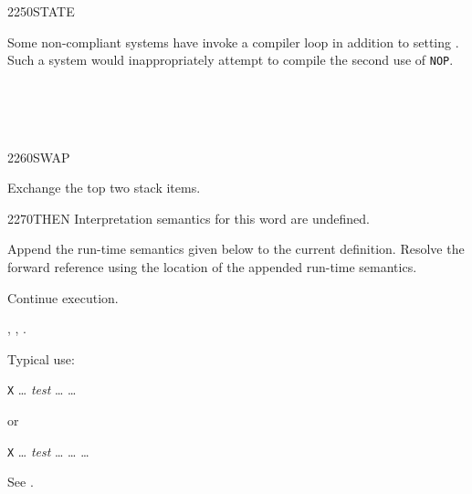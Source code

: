 \begin{worddef}{2250}{STATE}
\begin{rationale}
		Some non-compliant systems have \word{]} invoke a
		compiler loop in addition to setting . Such a
		system would inappropriately attempt to compile the second
		use of \texttt{NOP}.
	\end{rationale}

	\begin{testing} %
		 \\
		 \\
		 \\
	\end{testing}
\end{worddef}


\begin{worddef}{2260}{SWAP}
\item {}

	Exchange the top two stack items.

	\begin{testing} %
	\end{testing}
\end{worddef}


\begin{worddef}{2270}{THEN}
\interpret
	Interpretation semantics for this word are undefined.

\compile

	Append the run-time semantics given below to the current
	definition. Resolve the forward reference  using
	the location of the appended run-time semantics.

\runtime
	\stack{}{}

	Continue execution.

\see {},
	,
	.

	\begin{rationale} %
		Typical use:

		\tab \word{:} \texttt{X} {\ldots}
			\emph{test}  {\ldots} 
			{\ldots} \word{;}

		or

		\tab \word{:} \texttt{X} {\ldots}
			\emph{test}  {\ldots}  {\ldots} 
			{\ldots} \word{;}
	\end{rationale}

	\begin{testing} %
		See .
	\end{testing}
\end{worddef}

